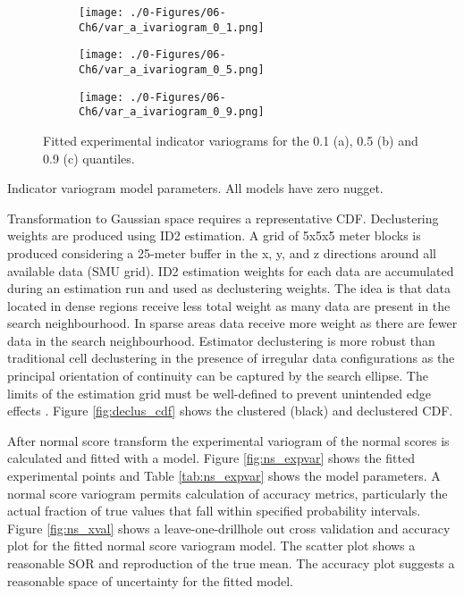 \begin{figure}
    \begin{subfigure}{1.0\textwidth}
        \centering
        \texttt{[image: ./0-Figures/06-Ch6/var\_a\_ivariogram\_0\_1.png]}
        \caption{}
    \end{subfigure}
    \begin{subfigure}{1.0\textwidth}
        \centering
        \texttt{[image: ./0-Figures/06-Ch6/var\_a\_ivariogram\_0\_5.png]}
        \caption{}
    \end{subfigure}
    \begin{subfigure}{1.0\textwidth}
        \centering
        \texttt{[image: ./0-Figures/06-Ch6/var\_a\_ivariogram\_0\_9.png]}
        \caption{}
    \end{subfigure}
    \caption{Fitted experimental indicator variograms for the 0.1 (a), 0.5 (b) and 0.9 (c) quantiles.}
    \label{fig:ind_expvar}
\end{figure}

\begin{table}[!htb]
    \centering
    \caption{Indicator variogram model parameters. All models have zero nugget.}
    \resizebox{0.9\width}{!}{}
    \label{tab:ind_expvar}
\end{table}

Transformation to Gaussian space requires a representative \gls{CDF}. Declustering weights are produced using \gls{ID2} estimation. A grid of 5x5x5 meter blocks is produced considering a 25-meter buffer in the x, y, and z directions around all available data (\gls{SMU} grid). \Gls{ID2} estimation weights for each data are accumulated during an estimation run and used as declustering weights. The idea is that data located in dense regions receive less total weight as many data are present in the search neighbourhood. In sparse areas data receive more weight as there are fewer data in the search neighbourhood. Estimator declustering is more robust than traditional cell declustering in the presence of irregular data configurations as the principal orientation of continuity can be captured by the search ellipse. The limits of the estimation grid must be well-defined to prevent unintended edge effects \cite{Wilde2007}. Figure \ref{fig:declus_cdf} shows the clustered (black) and declustered \gls{CDF}.

After normal score transform the experimental variogram of the normal scores is calculated and fitted with a model. Figure \ref{fig:ns_expvar} shows the fitted experimental points and Table \ref{tab:ns_expvar} shows the model parameters. A normal score variogram permits calculation of accuracy metrics, particularly the actual fraction of true values that fall within specified probability intervals. Figure \ref{fig:ns_xval} shows a leave-one-drillhole out cross validation and accuracy plot for the fitted normal score variogram model. The scatter plot shows a reasonable \gls{SOR} and reproduction of the true mean. The accuracy plot suggests a reasonable space of uncertainty for the fitted model.

